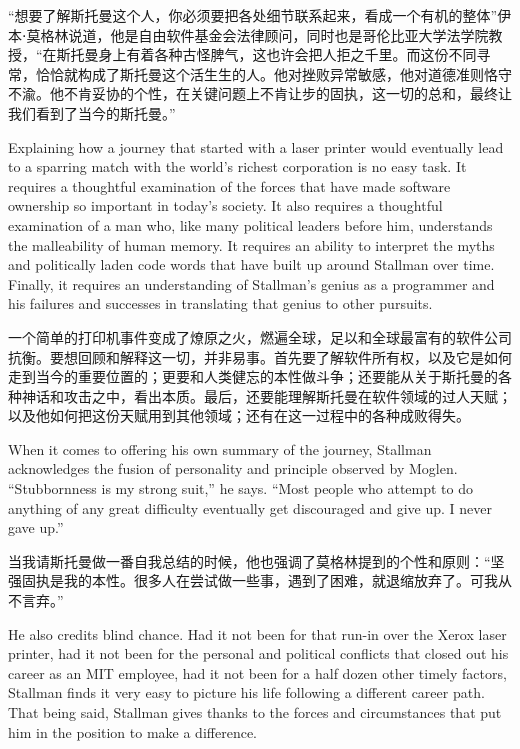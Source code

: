 \ifdefined\chs
``想要了解斯托曼这个人，你必须要把各处细节联系起来，看成一个有机的整体''伊本⋅莫格林说道，他是自由软件基金会法律顾问，同时也是哥伦比亚大学法学院教授，``在斯托曼身上有着各种古怪脾气，这也许会把人拒之千里。而这份不同寻常，恰恰就构成了斯托曼这个活生生的人。他对挫败异常敏感，他对道德准则恪守不渝。他不肯妥协的个性，在关键问题上不肯让步的固执，这一切的总和，最终让我们看到了当今的斯托曼。''
\fi

\ifdefined\eng
Explaining how a journey that started with a laser printer would eventually lead to a sparring match with the world's richest corporation is no easy task. It requires a thoughtful examination of the forces that have made software ownership so important in today's society. It also requires a thoughtful examination of a man who, like many political leaders before him, understands the malleability of human memory. It requires an ability to interpret the myths and politically laden code words that have built up around Stallman over time. Finally, it requires an understanding of Stallman's genius as a programmer and his failures and successes in translating that genius to other pursuits.
\fi

\ifdefined\chs
一个简单的打印机事件变成了燎原之火，燃遍全球，足以和全球最富有的软件公司抗衡。要想回顾和解释这一切，并非易事。首先要了解软件所有权，以及它是如何走到当今的重要位置的；更要和人类健忘的本性做斗争；还要能从关于斯托曼的各种神话和攻击之中，看出本质。最后，还要能理解斯托曼在软件领域的过人天赋；以及他如何把这份天赋用到其他领域；还有在这一过程中的各种成败得失。
\fi

\ifdefined\eng
When it comes to offering his own summary of the journey, Stallman acknowledges the fusion of personality and principle observed by Moglen. ``Stubbornness is my strong suit,'' he says. ``Most people who attempt to do anything of any great difficulty eventually get discouraged and give up. I never gave up.''
\fi

\ifdefined\chs
当我请斯托曼做一番自我总结的时候，他也强调了莫格林提到的个性和原则：``坚强固执是我的本性。很多人在尝试做一些事，遇到了困难，就退缩放弃了。可我从不言弃。''
\fi

\ifdefined\eng
He also credits blind chance. Had it not been for that run-in over the Xerox laser printer, had it not been for the personal and political conflicts that closed out his career as an MIT employee, had it not been for a half dozen other timely factors, Stallman finds it very easy to picture his life following a different career path. That being said, Stallman gives thanks to the forces and circumstances that put him in the position to make a difference.
\fi

